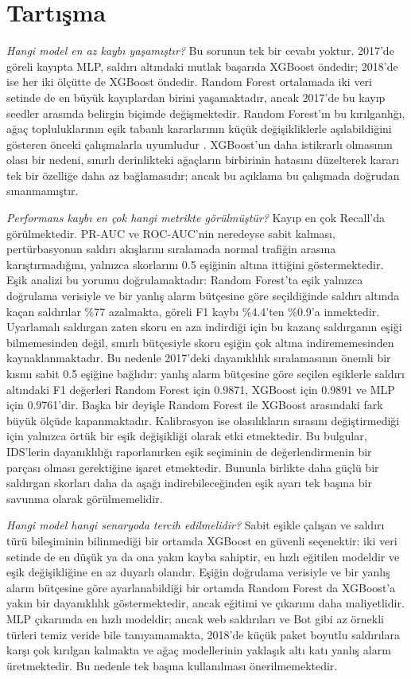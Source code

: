 \documentclass[conference]{IEEEtran}
\begin{document}
\section{Tartışma}

\emph{Hangi model en az kaybı yaşamıştır?} Bu sorunun tek bir cevabı yoktur. 2017'de göreli kayıpta MLP, saldırı altındaki mutlak başarıda XGBoost öndedir; 2018'de ise her iki ölçütte de XGBoost öndedir. Random Forest ortalamada iki veri setinde de en büyük kayıplardan birini yaşamaktadır, ancak 2017'de bu kayıp seedler arasında belirgin biçimde değişmektedir. Random Forest'ın bu kırılganlığı, ağaç topluluklarının eşik tabanlı kararlarının küçük değişikliklerle aşılabildiğini gösteren önceki çalışmalarla uyumludur \cite{kantchelian2016}. XGBoost'un daha istikrarlı olmasının olası bir nedeni, sınırlı derinlikteki ağaçların birbirinin hatasını düzelterek kararı tek bir özelliğe daha az bağlamasıdır; ancak bu açıklama bu çalışmada doğrudan sınanmamıştır.

\emph{Performans kaybı en çok hangi metrikte görülmüştür?} Kayıp en çok Recall'da görülmektedir. PR-AUC ve ROC-AUC'nin neredeyse sabit kalması, pertürbasyonun saldırı akışlarını sıralamada normal trafiğin arasına karıştırmadığını, yalnızca skorlarını 0.5 eşiğinin altına ittiğini göstermektedir. Eşik analizi bu yorumu doğrulamaktadır: Random Forest'ta eşik yalnızca doğrulama verisiyle ve bir yanlış alarm bütçesine göre seçildiğinde saldırı altında kaçan saldırılar \%77 azalmakta, göreli F1 kaybı \%4.4'ten \%0.9'a inmektedir. Uyarlamalı saldırgan zaten skoru en aza indirdiği için bu kazanç saldırganın eşiği bilmemesinden değil, sınırlı bütçesiyle skoru eşiğin çok altına indirememesinden kaynaklanmaktadır. Bu nedenle 2017'deki dayanıklılık sıralamasının önemli bir kısmı sabit 0.5 eşiğine bağlıdır: yanlış alarm bütçesine göre seçilen eşiklerle saldırı altındaki F1 değerleri Random Forest için 0.9871, XGBoost için 0.9891 ve MLP için 0.9761'dir. Başka bir deyişle Random Forest ile XGBoost arasındaki fark büyük ölçüde kapanmaktadır. Kalibrasyon ise olasılıkların sırasını değiştirmediği için yalnızca örtük bir eşik değişikliği olarak etki etmektedir. Bu bulgular, IDS'lerin dayanıklılığı raporlanırken eşik seçiminin de değerlendirmenin bir parçası olması gerektiğine işaret etmektedir. Bununla birlikte daha güçlü bir saldırgan skorları daha da aşağı indirebileceğinden eşik ayarı tek başına bir savunma olarak görülmemelidir.

\emph{Hangi model hangi senaryoda tercih edilmelidir?} Sabit eşikle çalışan ve saldırı türü bileşiminin bilinmediği bir ortamda XGBoost en güvenli seçenektir: iki veri setinde de en düşük ya da ona yakın kayba sahiptir, en hızlı eğitilen modeldir ve eşik değişikliğine en az duyarlı olandır. Eşiğin doğrulama verisiyle ve bir yanlış alarm bütçesine göre ayarlanabildiği bir ortamda Random Forest da XGBoost'a yakın bir dayanıklılık göstermektedir, ancak eğitimi ve çıkarımı daha maliyetlidir. MLP çıkarımda en hızlı modeldir; ancak web saldırıları ve Bot gibi az örnekli türleri temiz veride bile tanıyamamakta, 2018'de küçük paket boyutlu saldırılara karşı çok kırılgan kalmakta ve ağaç modellerinin yaklaşık altı katı yanlış alarm üretmektedir. Bu nedenle tek başına kullanılması önerilmemektedir.
\end{document}
